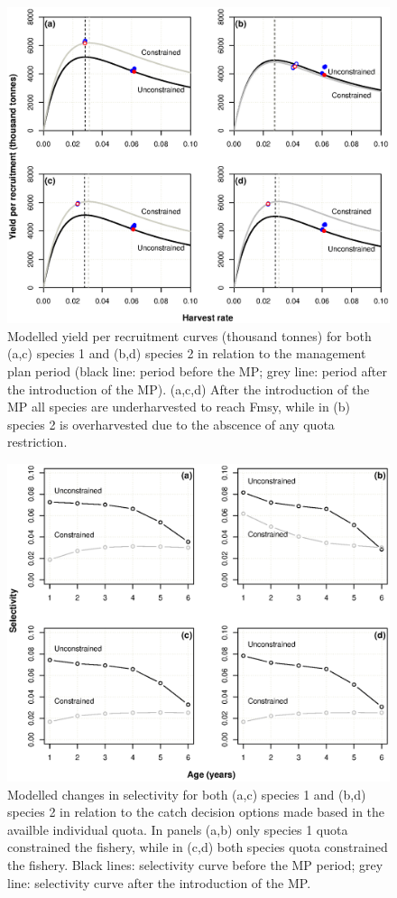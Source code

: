 \documentclass[12pt,oneline,a4paper,numbib]{ouparticle}
\numberwithin{equation}{subsection} %
\begin{document}
\begin{figure}[!ht]
\centering
\includegraphics[width=\textwidth]{Figures/Yields.eps} 
\caption{Modelled yield per recruitment curves (thousand tonnes) for both (a,c) species 1 and (b,d) species 2 in relation to the management plan period (black line: period before the MP; grey line: period after the introduction of the MP). (a,c,d) After the introduction of the MP all species are underharvested to reach Fmsy, while in (b) species 2 is overharvested due to the abscence of any quota restriction.}
\end{figure}

\begin{figure}[!ht]
\centering
\includegraphics[width=\textwidth]{Figures/Selectivity.eps} 
\caption{Modelled changes in selectivity for both (a,c) species 1 and (b,d) species 2 in relation to the catch decision options made based in the availble individual quota. In panels (a,b) only species 1 quota constrained the fishery, while in (c,d) both species quota constrained the fishery. Black lines: selectivity curve before the MP period; grey line: selectivity curve after the introduction of the MP.}
\end{figure}
\end{document}
